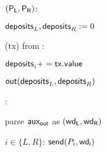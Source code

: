 \begin{bbox}[title=$\Pi_{pay}$: $\msf{Contract_{pay}}$]

\Init $({\mathsf {P_L}}, {\mathsf {P_R}})$:

\quad ${\mathsf {deposits}}_L, {\mathsf {deposits}}_R := 0$

\OnInput {}(tx) from \Partyi:

	\quad ${\mathsf {deposits}}_i += {\mathsf {tx.value}}$

	\quad ${\mathsf {out}}({\mathsf {deposits}}_L, {\mathsf {deposits}}_R)$

\OnInput {}:

	\quad parse ${\mathsf {aux_{out}}}$ as $({\mathsf {wd_L}},{\mathsf {wd_R}})$

	\quad \For $i \in \{L,R\}$: ${\mathsf {send}}(P_i, {\mathsf {wd_i}})$

\end{bbox}
